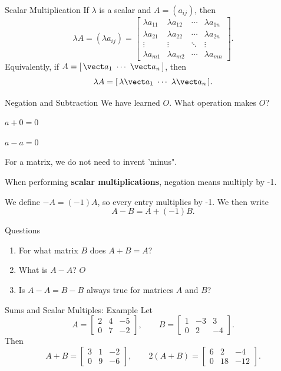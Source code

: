 \begin{frame}{Scalar Multiplication}
If $\lambda$ is a scalar and $A=(a_{ij})$, then
\[
\lambda A=(\lambda a_{ij})
=\begin{bmatrix}
\lambda a_{11}&\lambda a_{12}&\cdots&\lambda a_{1n}\\
\lambda a_{21}&\lambda a_{22}&\cdots&\lambda a_{2n}\\
\vdots&\vdots&\ddots&\vdots\\
\lambda a_{m1}&\lambda a_{m2}&\cdots&\lambda a_{mn}
\end{bmatrix}.
\]
Equivalently, if $A=[\,\vect a_1\ \cdots\ \vect a_n\,]$, then
\[
\lambda A=[\,\lambda\vect a_1\ \cdots\ \lambda\vect a_n\,].
\]
\end{frame}

\begin{frame}{Negation and Subtraction}
We have learned $O$. What operation makes $O$?\pause

$a+0=0$

$a-a=0$ \pause

For a matrix, we do not need to invent 'minus".

When performing \textbf{scalar multiplications}, negation means multiply by -1.

We define $-A=(-1)A$, so every entry multiplies by -1. We then write
\[
A-B=A+(-1)B.
\]
\begin{exampleblock}{Questions}
\begin{enumerate}
  \item For what matrix $B$ does $A+B=A$?
  \item What is $A-A$? \pause $O$
  \item Is $A-A=B-B$ always true for matrices $A$ and $B$?
\end{enumerate}
\end{exampleblock}
\end{frame}


\begin{frame}{Sums and Scalar Multiples: Example}
Let
\[
A=\begin{bmatrix}2&4&-5\\0&7&-2\end{bmatrix},\qquad
B=\begin{bmatrix}1&-3&3\\0&2&-4\end{bmatrix}.
\]
Then
\[
A+B=\begin{bmatrix}3&1&-2\\0&9&-6\end{bmatrix},
\qquad
2(A+B)=\begin{bmatrix}6&2&-4\\0&18&-12\end{bmatrix}.
\]
\end{frame}



